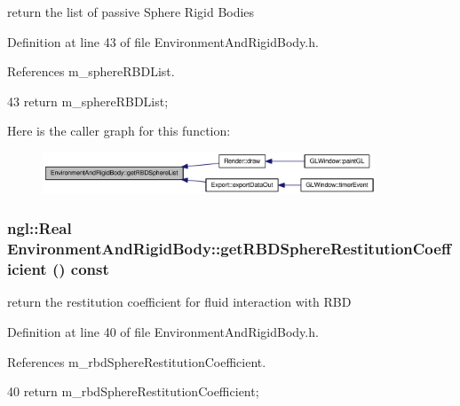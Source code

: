 return the list of passive Sphere Rigid Bodies 



Definition at line 43 of file EnvironmentAndRigidBody.h.



References m\_\-sphereRBDList.




\begin{DoxyCode}
43 { return m_sphereRBDList; }
\end{DoxyCode}




Here is the caller graph for this function:\nopagebreak
\begin{figure}[H]
\begin{center}
\leavevmode
\includegraphics[width=281pt]{class_environment_and_rigid_body_ab8f19c02935c0763d700dadf8ff4c097_icgraph}
\end{center}
\end{figure}


\hypertarget{class_environment_and_rigid_body_affe6ded30a2dcaf201668e4754ba9f9b}{
\subsubsection[{getRBDSphereRestitutionCoefficient}]{\setlength{\rightskip}{0pt plus 5cm}ngl::Real EnvironmentAndRigidBody::getRBDSphereRestitutionCoefficient () const}}
\label{class_environment_and_rigid_body_affe6ded30a2dcaf201668e4754ba9f9b}


return the restitution coefficient for fluid interaction with RBD 



Definition at line 40 of file EnvironmentAndRigidBody.h.



References m\_\-rbdSphereRestitutionCoefficient.




\begin{DoxyCode}
40 { return m_rbdSphereRestitutionCoefficient; }
\end{DoxyCode}



